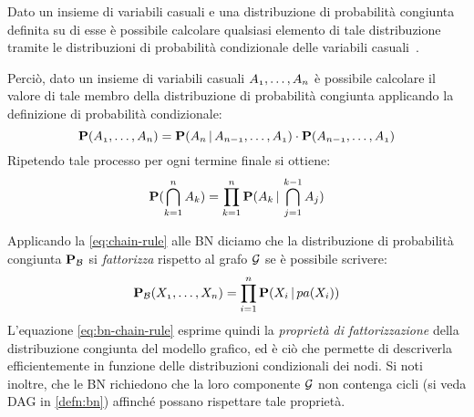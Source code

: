 \begin{teorema}
Dato un insieme di variabili casuali e una distribuzione di probabilità congiunta definita su di esse è possibile calcolare qualsiasi elemento di tale distribuzione tramite le distribuzioni di probabilità condizionale delle variabili casuali~\cite{Russel2003}.
\end{teorema}

Perciò, dato un insieme di variabili casuali $\mathnormal{A_1},\dotsc,\mathnormal{A_n}$ è possibile calcolare il valore di tale membro della distribuzione di probabilità congiunta applicando la definizione di probabilità condizionale:
\[
\mathbf{P}(\mathnormal{A_1},\dotsc,\mathnormal{A_n})=\mathbf{P}(\mathnormal{A_n}\,|\,\mathnormal{A_{n-1}},\dotsc,\mathnormal{A_1})\cdot\mathbf{P}(\mathnormal{A_{n-1}},\dotsc,\mathnormal{A_1})
\]
Ripetendo tale processo per ogni termine finale si ottiene:
\begin{equation}
\label{eq:chain-rule}
\mathbf{P}(\bigcap_{k=1}^{n}\mathnormal{A_k})=\prod_{k=1}^{n}\mathbf{P}(\mathnormal{A_k}\,|\,\bigcap_{j=1}^{k-1}\mathnormal{A_j})
\end{equation}

Applicando la \eqref{eq:chain-rule} alle \acl{BN} diciamo che la distribuzione di probabilità congiunta $\mathbf{P}_{\mathcal{B}}$ si \emph{fattorizza} rispetto al grafo $\mathcal{G}$ se è possibile scrivere:
\begin{equation}
\label{eq:bn-chain-rule}
\mathbf{P}_{\mathcal{B}}(\mathnormal{X_1}, \dotsc, \mathnormal{X_n})=\prod_{i=1}^{n}\mathbf{P}(\mathnormal{X_i}\,|\,pa(\mathnormal{X_i}))
\end{equation}
L'equazione \eqref{eq:bn-chain-rule} esprime quindi la \emph{proprietà di fattorizzazione} della distribuzione congiunta del modello grafico, ed è ciò che permette di descriverla efficientemente in funzione delle distribuzioni condizionali dei nodi. Si noti inoltre, che le \acl{BN} richiedono che la loro componente $\mathcal{G}$ non contenga cicli (si veda \acs{DAG} in \ref{defn:bn}) affinché possano rispettare tale proprietà.

